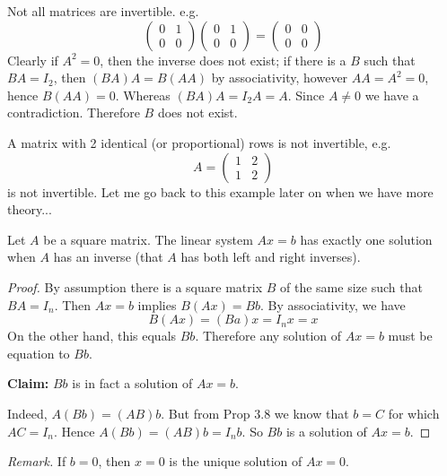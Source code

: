 \documentclass[10pt]{scrartcl}
\begin{document}
\begin{warning}
Not all matrices are invertible. e.g. 
\[\begin{pmatrix}
0 & 1 \\ 0 & 0	
\end{pmatrix}\begin{pmatrix}
0 & 1\\ 0 & 0	
\end{pmatrix} = \begin{pmatrix}
 0 & 0 \\ 0 & 0	
 \end{pmatrix}
\]
Clearly if $A^2 = 0$, then the inverse does not exist; if there is a $B$ such that $BA = I_2$, then $(BA)A = B(AA)$ by associativity, however $AA = A^2 = 0$, hence $B(AA) = 0$. Whereas $(BA)A = I_2A = A$. Since $A \neq 0$ we have a contradiction. Therefore $B$ does not exist.
\end{warning}


A matrix with 2 identical (or proportional) rows is not invertible, e.g. \[A = \begin{pmatrix}
 1 & 2\\ 1 & 2	
 \end{pmatrix}\] is not invertible. Let me go back to this example later on when we have more theory...
 
 \begin{proposition}
 Let $A$ be a square matrix. The linear system $Ax = b$ has exactly one solution when $A$ has an inverse (that $A$ has both left and right inverses). 	
 \end{proposition}
 \begin{proof}
 By assumption there is a square matrix $B$ of the same size such that $BA =I_n$. Then $Ax = b$ implies $B(Ax) = Bb$. By associativity, we have
 \[
  B(Ax) = (Ba)x = I_nx = x
\]
On the other hand, this equals $Bb$. Therefore any solution of $Ax = b$ must be equation to $Bb$. 

\textbf{Claim:} $Bb$ is in fact a solution of $Ax = b$. 

Indeed, $A(Bb) = (AB)b$. But from Prop 3.8 we know that $b=C$ for which $AC = I_n$. Hence $A(Bb) = (AB)b = I_nb$. So $Bb$ is a solution of $Ax = b$.
 \end{proof}\vsp
 
 \emph{Remark.} If $b =0$, then $x = 0$ is the unique solution of $Ax = 0$. 
\vspace*{2cm}
\end{document}
